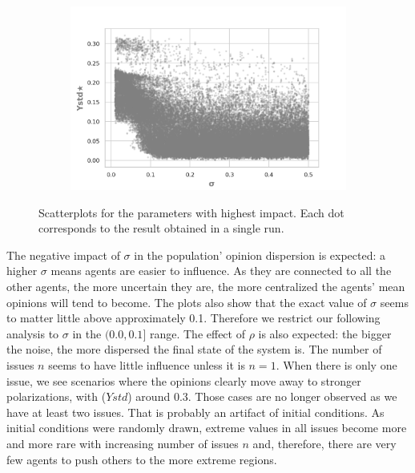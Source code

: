 \documentclass{article}
\begin{document}
\begin{figure}[H]
\begin{subfigure}[b]{0.48\textwidth}
     \end{subfigure}
     \begin{subfigure}[b]{0.5\textwidth}
       \includegraphics[width=\textwidth]{img/regressionYstd*sigma.png}
     \end{subfigure}
     \caption{Scatterplots for the parameters with highest impact. Each dot corresponds to the result obtained in a single run.}
      \label{fig:scatters}
    \end{figure}


    The negative impact of \(\sigma\) in the population' opinion dispersion is
    expected: a higher \(\sigma\) means agents are easier to influence. As they
    are connected to all the other agents, the more uncertain they are, the more
    centralized the agents' mean opinions will tend to become. The plots also
    show that the exact value of \(\sigma\) seems to matter little above
    approximately 0.1. Therefore we restrict our following analysis to \(\sigma\) in the
    \((0.0, 0.1 ] \) range. The effect of \(\rho\) is also expected: the bigger
    the noise, the more dispersed the final state of the system is. The number
    of issues $n$ seems to have little influence unless it is $n=1$. When there
    is only one issue, we see scenarios where the opinions clearly move away to
    stronger polarizations, with (\(Ystd\)) around 0.3. Those cases are no
    longer observed as we have at least two issues. That is probably an artifact of initial conditions.
    As initial conditions were randomly drawn, extreme values in all issues become more and more rare
    with increasing number of issues $n$ and, therefore, there are very few agents to push others to the more extreme regions.
\end{document}
